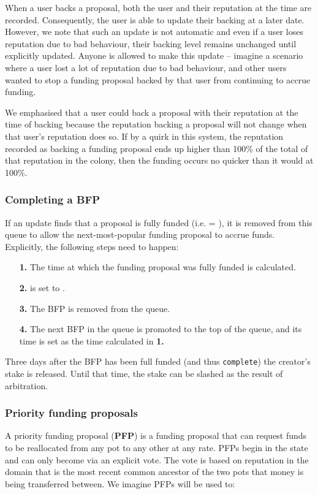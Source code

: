 When a user backs a proposal, both the user and their reputation at the time are recorded. Consequently, the user is able to update their backing at a later date. However, we note that such an update is not automatic and even if a user loses reputation due to bad behaviour, their backing level remains unchanged until explicitly updated. Anyone is allowed to make this update -- imagine a scenario where a user lost a lot of reputation due to bad behaviour, and other users wanted to stop a funding proposal backed by that user from continuing to accrue funding.

We emphasised that a user could back a proposal with their reputation at the time of backing because the reputation backing a proposal will not change when that user's reputation does so. If by a quirk in this system, the reputation recorded as backing a funding proposal ends up higher than 100\% of the total of that reputation in the colony, then the funding occurs no quicker than it would at 100\%.

\subsubsection*{Completing a BFP}
If an update finds that a proposal is fully funded (i.e.  = ), it is removed from this queue to allow the next-most-popular funding proposal to accrue funds. Explicitly, the following steps need to happen:
\begin{itemize}
 \item[\textbf{1.}] The time at which the funding proposal was fully funded is calculated.%
 \item[\textbf{2.}]  is set to .
 \item[\textbf{3.}] The BFP is removed from the queue.
 \item[\textbf{4.}] The next BFP in the queue is promoted to the top of the queue, and its  time is set as the time calculated in \textbf{1.}
\end{itemize}

Three days after the BFP has been full funded (and thus \texttt{complete}) the creator's stake is released. Until that time, the stake can be slashed as the result of arbitration.

\subsubsection{Priority funding proposals}
A priority funding proposal (\textbf{PFP}) is a funding proposal that can request funds to be reallocated from any pot to any other at any rate. PFPs begin in the  state and can only become  via an explicit vote. The vote is based on reputation in the domain that is the most recent common ancestor of the two pots that money is being transferred between. We imagine PFPs will be used to:

